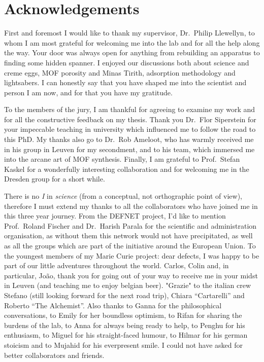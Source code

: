 
\chapter{Acknowledgements}

First and foremost I would like to thank my supervisor, Dr.\ Philip Llewellyn,
to whom I am most grateful for welcoming me into the lab and for all the help
along the way. Your door was always open for anything from rebuilding
an apparatus to finding some hidden spanner. I enjoyed our discussions 
both about science and creme eggs, MOF porosity and Minas Tirith, adsorption 
methodology and lightsabers. I can honestly say that you have shaped
me into the scientist and person I am now, and for that you have my gratitude.

To the members of the jury, I am thankful for agreeing to examine 
my work and for all the constructive feedback on my thesis.
Thank you Dr.\ Flor Siperstein for your impeccable teaching in university which
influenced me to follow the road to this PhD. My thanks also go to Dr.\ Rob Ameloot,
who has warmly received me in his group in Leuven for my secondment, and 
to his team, which immersed me into the arcane art of MOF synthesis.
Finally, I am grateful to Prof.\ Stefan Kaskel for a wonderfully interesting
collaboration and for welcoming me in the Dresden group for a
short while.

There is no \textit{I} in \textit{science} (from a conceptual, not orthographic
point of view), therefore I must extend my thanks to all the collaborators
who have joined me in this three year journey. From the DEFNET project,
I'd like to mention Prof.\ Roland Fischer and Dr.\ Harish Parala for the 
scientific and administration organisation, as without them this network
would not have precipitated, as well as all the groups which are part 
of the initiative around the European Union. To the youngest members of 
my Marie Curie project: dear defects, I was happy to be part of our little
adventures throughout the world. Carlos, Colin and, in particular, João,
thank you for going out of your way to receive me in your midst in Leuven
(and teaching me to enjoy belgian beer). "Grazie" to the italian crew 
Stefano (still looking forward for the next road trip), Chiara ``Cartarelli''
and Roberto ``The Alchemist''. Also thanks to Ganna for the philosophical 
conversations, to Emily for her boundless optimism, to Rifan for sharing
the burdens of the lab, to Anna for always being ready to help,
to Penghu for his enthusiasm, to Miguel for his straight-faced humour,
to Hilmar for his german stoicism and to Mujahid for his everpresent smile.
I could not have asked for better collaborators and friends.

